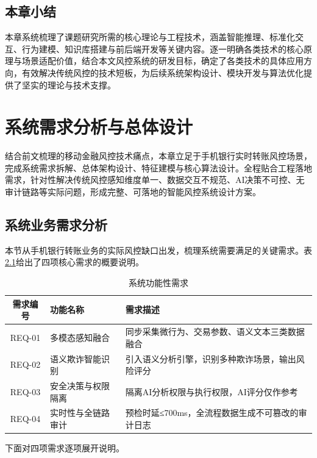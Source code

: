 \documentclass[twoside,openright]{xduugthesis}
\begin{document}
\section{本章小结}
本章系统梳理了课题研究所需的核心理论与工程技术，涵盖智能推理、标准化交互、行为建模、知识库搭建与前后端开发等关键内容。逐一明确各类技术的核心原理与场景适配价值，结合本文风控系统的研发目标，确定了各类技术的具体应用方向，有效解决传统风控的技术短板，为后续系统架构设计、模块开发与算法优化提供了坚实的理论与技术支撑。

\chapter{系统需求分析与总体设计}

结合前文梳理的移动金融风控技术痛点，本章立足于手机银行实时转账风控场景，完成系统需求拆解、总体架构设计、特征建模与核心算法设计。全程贴合工程落地需求，针对性解决传统风控感知维度单一、数据交互不规范、AI决策不可控、无审计链路等实际问题，形成完整、可落地的智能风控系统设计方案。

\section{系统业务需求分析}

本节从手机银行转账业务的实际风控缺口出发，梳理系统需要满足的关键需求。表\ref{tab:functional-requirement}给出了四项核心需求的概要说明。

\begin{table}[H]
    \centering
    \caption{系统功能性需求}
    \label{tab:functional-requirement}
    \begin{tabular}{|c|p{3cm}|p{6cm}|}
        \hline
        需求编号 & 功能名称 & 需求描述 \\
        \hline
        REQ-01 & 多模态感知融合 & 
        同步采集微行为、交易参数、语义文本三类数据融合\\
        \hline
        REQ-02 & 语义欺诈智能识别 & 
        引入语义分析引擎，识别多种欺诈场景，输出风险评分 \\
        \hline
        REQ-03 & 安全决策与权限隔离 & 
        隔离AI分析权限与执行权限，AI评分仅作参考 \\
        \hline
        REQ-04 & 实时性与全链路审计 & 
        预检时延≤700ms，全流程数据生成不可篡改的审计日志\\
        \hline
    \end{tabular}
\end{table}

下面对四项需求逐项展开说明。
\end{document}
